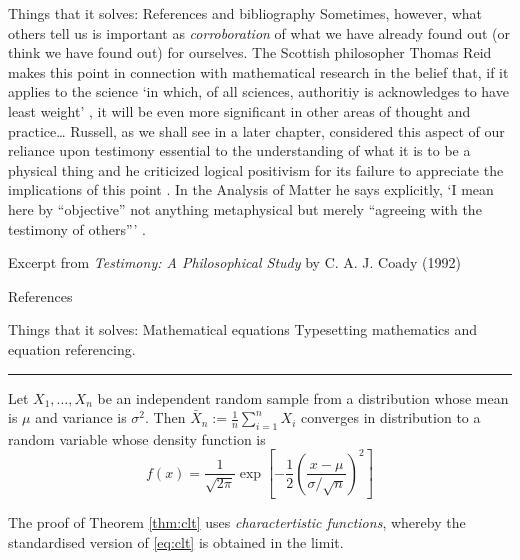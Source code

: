 \documentclass[,aspectratio=43]{beamer}
\begin{document}
\begin{frame}{Things that it solves: References and bibliography}
\protect\hypertarget{things-that-it-solves-references-and-bibliography}{}
Sometimes, however, what others tell us is important as
\emph{corroboration} of what we have already found out (or think we have
found out) for ourselves. The Scottish philosopher Thomas Reid makes
this point in connection with mathematical research in the belief that,
if it applies to the science `in which, of all sciences, authoritiy is
acknowledges to have least weight' \cite{reid2002thomas}, it will be
even more significant in other areas of thought and practice\ldots{}
Russell, as we shall see in a later chapter, considered this aspect of
our reliance upon testimony essential to the understanding of what it is
to be a physical thing and he criticized logical positivism for its
failure to appreciate the implications of this point
\cite{russell2007logic}. In the Analysis of Matter he says explicitly,
`I mean here by ``objective'' not anything metaphysical but merely
``agreeing with the testimony of others''' \cite{russell2015analysis}.

\vspace{1em}

Excerpt from \emph{Testimony: A Philosophical Study} by C. A. J. Coady
(1992)
\end{frame}

\begin{frame}{References}
\protect\hypertarget{references}{}
\nocite{coady1992testimony} \printbibliography[heading=none]
\end{frame}

\begin{frame}{Things that it solves: Mathematical equations}
\protect\hypertarget{things-that-it-solves-mathematical-equations}{}
Typesetting mathematics and equation referencing.

\vspace{1em}

\hrule

\vspace{0.5em}

\begin{theorem}
\label{thm:clt} Let \(X_1,\dots,X_n\) be an independent random sample
from a distribution whose mean is \(\mu\) and variance is \(\sigma^2\).
Then \(\bar X_n := \frac{1}{n}\sum_{i=1}^n X_i\) converges in
distribution to a random variable whose density function is
\begin{equation}
\label{eq:clt}
f(x) = \frac{1}{\sqrt{2\pi}} \exp\left[ -\frac{1}{2}\left(\frac{x - \mu}{\sigma/\sqrt n} \right)^2 \right]
\end{equation}
\end{theorem}

The proof of Theorem \ref{thm:clt} uses \emph{charactertistic
functions}, whereby the standardised version of \eqref{eq:clt} is
obtained in the limit.
\end{frame}
\end{document}
